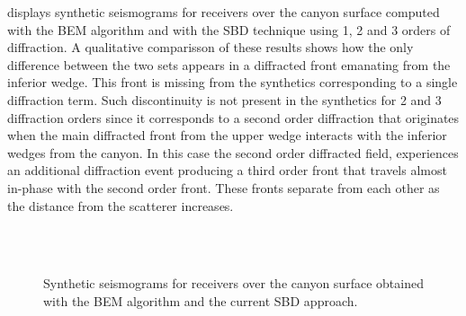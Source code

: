 \documentclass[11pt,letterpaper]{article}
\begin{document}
%
 displays synthetic seismograms for receivers over the canyon surface computed with the BEM algorithm and with the SBD technique using 1, 2 and 3 orders of diffraction. A qualitative comparisson of these results shows how the only difference between the two sets appears in a diffracted front emanating from the inferior wedge. This front is missing from the synthetics corresponding to a single diffraction term. Such discontinuity is not present in the synthetics for 2 and 3 diffraction orders since it corresponds to a second order diffraction that originates when the main diffracted front from the upper wedge interacts with the inferior wedges from the canyon. In this case the second order diffracted field, experiences an additional diffraction event producing a third order front that travels almost in-phase with the second order front. These fronts separate from each other as the distance from the scatterer increases.
%
\begin{figure}[H]
	\centering
	\
	\hspace{-.25cm}
	\\
	\vspace{-1.5cm}
	\,
	\hspace{-.25cm}
	\vspace{-.25cm}
	\caption{Synthetic seismograms for receivers over the canyon surface obtained with the BEM algorithm and the current SBD approach.}
	\label{fig:sabanascontor}
\end{figure}
\end{document}
